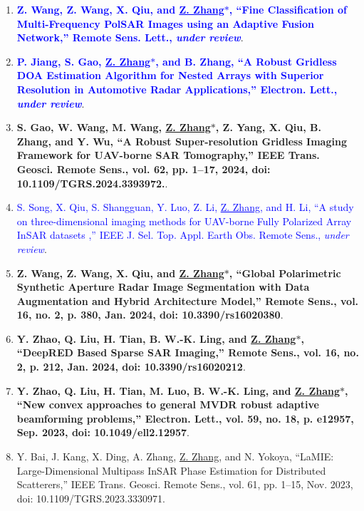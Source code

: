 \documentclass[paper=a4,fontsize=11pt]{scrartcl}
\begin{document}
\begin{enumerate}
\item \textcolor{blue}{\textbf{Z. Wang, Z. Wang, X. Qiu, and \underline{Z. Zhang$\ast$}, ``Fine Classification of Multi-Frequency PolSAR Images using an Adaptive Fusion Network,'' Remote Sens. Lett., \emph{under review}}}.

\item \textcolor{blue}{\textbf{P. Jiang, S. Gao, \underline{Z. Zhang$\ast$}, and B. Zhang, ``A Robust Gridless DOA Estimation Algorithm for Nested Arrays with Superior Resolution in Automotive Radar Applications,'' Electron. Lett., \emph{under review}}}.

\item \textbf{S. Gao, W. Wang, M. Wang, \underline{Z. Zhang$\ast$}, Z. Yang, X. Qiu, B. Zhang, and Y. Wu, ``A Robust Super-resolution Gridless Imaging Framework for UAV-borne SAR Tomography,'' IEEE Trans. Geosci. Remote Sens., vol. 62, pp. 1–17, 2024, doi: 10.1109/TGRS.2024.3393972.}.

\item \textcolor{blue}{S. Song, X. Qiu, S. Shangguan, Y. Luo, Z. Li, \underline{Z. Zhang}, and H. Li, ``A study on three-dimensional imaging methods for UAV-borne Fully Polarized Array InSAR datasets ,'' IEEE J. Sel. Top. Appl. Earth Obs. Remote Sens., \emph{under review}}.

\item \textbf{Z. Wang, Z. Wang, X. Qiu, and \underline{Z. Zhang$\ast$}, ``Global Polarimetric Synthetic Aperture Radar Image Segmentation with Data Augmentation and Hybrid Architecture Model,'' Remote Sens., vol. 16, no. 2, p. 380, Jan. 2024, doi: 10.3390/rs16020380}.

\item \textbf{Y. Zhao, Q. Liu, H. Tian, B. W.-K. Ling, and \underline{Z. Zhang$\ast$}, ``DeepRED Based Sparse SAR Imaging,'' Remote Sens., vol. 16, no. 2, p. 212, Jan. 2024, doi: 10.3390/rs16020212}.

\item \textbf{Y. Zhao, Q. Liu, H. Tian, M. Luo, B. W.-K. Ling, and \underline{Z. Zhang$\ast$}, ``New convex approaches to general MVDR robust adaptive beamforming problems,'' Electron. Lett., vol. 59, no. 18, p. e12957, Sep. 2023, doi: 10.1049/ell2.12957}.

\item Y. Bai, J. Kang, X. Ding, A. Zhang, \underline{Z. Zhang}, and N. Yokoya, ``LaMIE: Large-Dimensional Multipass InSAR Phase Estimation for Distributed Scatterers,'' IEEE Trans. Geosci. Remote Sens., vol. 61, pp. 1–15, Nov. 2023, doi: 10.1109/TGRS.2023.3330971.


\end{enumerate}
\end{document}

